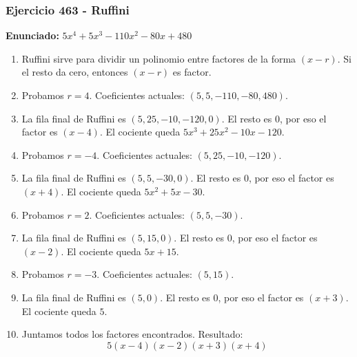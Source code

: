 \documentclass[11pt,a4paper]{article}
\begin{document}
\subsubsection*{Ejercicio 463 - Ruffini}
\textbf{Enunciado:} $ 5 x^{4} + 5 x^{3} - 110 x^{2} - 80 x + 480 $\par
\begin{enumerate}[leftmargin=2em]
\item Ruffini sirve para dividir un polinomio entre factores de la forma \((x-r)\). Si el resto da cero, entonces \((x-r)\) es factor.
\item Probamos \(r=4\). Coeficientes actuales: \((5, 5, -110, -80, 480)\).
\item La fila final de Ruffini es \((5, 25, -10, -120, 0)\). El resto es \(0\), por eso el factor es \((x-4)\). El cociente queda \(5 x^{3} + 25 x^{2} - 10 x - 120\).
\item Probamos \(r=-4\). Coeficientes actuales: \((5, 25, -10, -120)\).
\item La fila final de Ruffini es \((5, 5, -30, 0)\). El resto es \(0\), por eso el factor es \((x+4)\). El cociente queda \(5 x^{2} + 5 x - 30\).
\item Probamos \(r=2\). Coeficientes actuales: \((5, 5, -30)\).
\item La fila final de Ruffini es \((5, 15, 0)\). El resto es \(0\), por eso el factor es \((x-2)\). El cociente queda \(5 x + 15\).
\item Probamos \(r=-3\). Coeficientes actuales: \((5, 15)\).
\item La fila final de Ruffini es \((5, 0)\). El resto es \(0\), por eso el factor es \((x+3)\). El cociente queda \(5\).
\item Juntamos todos los factores encontrados. Resultado: \[\boxed{5 \left(x - 4\right) \left(x - 2\right) \left(x + 3\right) \left(x + 4\right)}\]
\end{enumerate}

\vspace{0.2cm}
\end{document}
